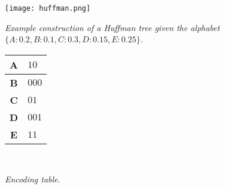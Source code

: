 \documentclass[12pt, fleqn]{general}
\begin{document}
    \begin{center}
    \texttt{[image: huffman.png]}\\\vspace{10pt}

    \emph{Example construction of a Huffman tree given the alphabet $\{A:0.2, B:0.1, C:0.3, D:0.15, E:0.25\}$.}\\\vspace{10pt}

    \begin{tabular}{|c|l|}\hline
        \textbf{A}&$10$\\\hline
        \textbf{B}&$000$\\\hline
        \textbf{C}&$01$\\\hline
        \textbf{D}&$001$\\\hline
        \textbf{E}&$11$\\\hline
    \end{tabular}\\\vspace{10pt}

    \emph{Encoding table.}
    \end{center}

    \newpage

    \begin{multicols*}{2}

\end{multicols*}
\end{document}
